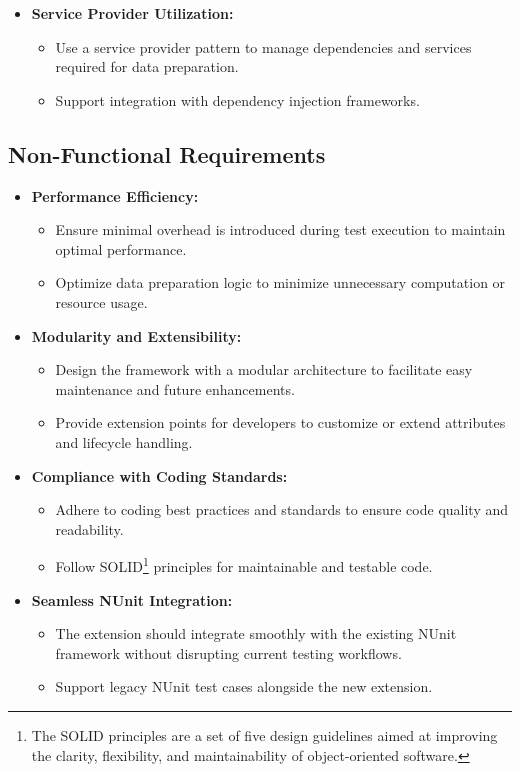 \begin{itemize}
    \item \textbf{Service Provider Utilization:}
    \begin{itemize}
        \item Use a service provider pattern to manage dependencies and services required for data preparation.
        \item Support integration with dependency injection frameworks.
    \end{itemize}
\end{itemize}

\subsection*{Non-Functional Requirements}

\begin{itemize}
    \item \textbf{Performance Efficiency:}
    \begin{itemize}
        \item Ensure minimal overhead is introduced during test execution to maintain optimal performance.
        \item Optimize data preparation logic to minimize unnecessary computation or resource usage.
    \end{itemize}
    
    \item \textbf{Modularity and Extensibility:}
    \begin{itemize}
        \item Design the framework with a modular architecture to facilitate easy maintenance and future enhancements.
        \item Provide extension points for developers to customize or extend attributes and lifecycle handling.
    \end{itemize}
    
    \item \textbf{Compliance with Coding Standards:}
    \begin{itemize}
        \item Adhere to coding best practices and standards to ensure code quality and readability.
        \item Follow SOLID\footnote{The SOLID principles are a set of five design guidelines aimed at improving the clarity, flexibility, and maintainability of object-oriented software.} principles for maintainable and testable code.
    \end{itemize}
    
    \item \textbf{Seamless NUnit Integration:}
    \begin{itemize}
        \item The extension should integrate smoothly with the existing NUnit framework without disrupting current testing workflows.
        \item Support legacy NUnit test cases alongside the new extension.
    \end{itemize}
\end{itemize}

